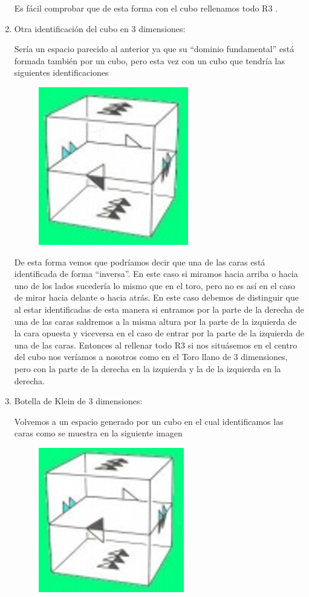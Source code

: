 \begin{enumerate}
Es fácil comprobar que de esta forma con el cubo rellenamos todo R3 .


\item Otra identificación del cubo en 3 dimensiones:

Sería un espacio parecido al anterior ya que su “dominio fundamental” está formada también por un cubo, pero esta vez con un cubo que tendría las siguientes identificaciones 

\begin{figure}[H]
	\centering
	\includegraphics[scale=0.7]{images/universo/universo_2_1.png}
\end{figure}


De esta forma vemos que podríamos decir que una de las caras está identificada de forma “inversa”. En este caso si miramos hacia arriba o hacia uno de los lados sucedería lo mismo que en el toro, pero no es así en el caso de mirar hacia delante o hacia atrás. En este caso debemos de distinguir que al estar identificadas de esta manera si entramos por la parte de la derecha de una de las caras saldremos a la misma altura por la parte de la izquierda de la cara opuesta y viceversa en el caso de entrar por la parte de la izquierda de una de las caras. Entonces al rellenar todo R3 si nos situásemos en el centro del cubo nos veríamos a nosotros como en el Toro llano de 3 dimensiones, pero con la parte de la derecha en la izquierda y la de la izquierda en la derecha. 



\item  Botella de Klein de 3 dimensiones:

Volvemos a un espacio generado por un cubo en el cual identificamos las caras como se muestra en la siguiente imagen 

\begin{figure}[H]
	\centering
	\includegraphics[scale=0.7]{images/universo/universo_3_1.png}
\end{figure}


\end{enumerate}
